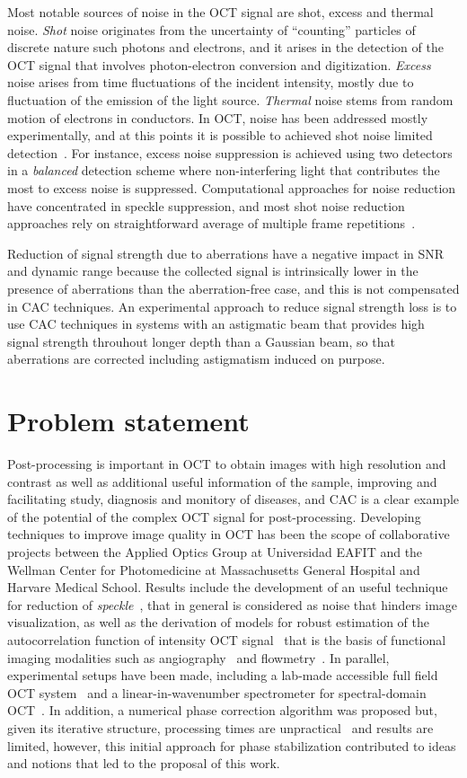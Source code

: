 Most notable sources of noise in the OCT signal are shot, excess and thermal noise.  \textit{Shot} noise originates from the uncertainty of ``counting'' particles of discrete nature such photons and electrons, and it arises in the detection of the OCT signal that involves photon-electron conversion and digitization. \textit{Excess} noise arises from time fluctuations of the incident intensity, mostly due to fluctuation of the emission of the light source. \textit{Thermal} noise stems from random motion of electrons in conductors. In OCT, noise has been addressed mostly experimentally, and at this points it is possible to achieved shot noise limited detection~\cite{}. For instance, excess noise suppression is achieved using two detectors in a \textit{balanced} detection scheme where non-interfering light that contributes the most to excess noise is suppressed. Computational approaches for noise reduction have concentrated in speckle suppression, and most shot noise reduction approaches rely on straightforward average of multiple frame repetitions~\cite{}.

Reduction of signal strength due to aberrations have a negative impact in SNR and dynamic range because the collected signal is intrinsically lower in the presence of aberrations than the aberration-free case, and this is not compensated in CAC techniques. An experimental approach to reduce signal strength loss is to use CAC techniques in systems with an astigmatic beam that provides high signal strength throuhout longer depth than a Gaussian beam, so that aberrations are corrected including astigmatism induced on purpose.


\section{Problem statement}

Post-processing is important in OCT to obtain images with high resolution and contrast as well as additional useful information of the sample, improving and facilitating study, diagnosis and monitory of diseases, and CAC is a clear example of the potential of the complex OCT signal for post-processing. Developing techniques to improve image quality in OCT has been the scope of collaborative projects between the Applied Optics Group at Universidad EAFIT and the Wellman Center for Photomedicine at Massachusetts General Hospital and Harvare Medical School. Results include the development of an useful technique for reduction of \textit{speckle}~\cite{}, that in general is considered as noise that hinders image visualization, as well as the derivation of models for robust estimation of the autocorrelation function of intensity OCT signal~\cite{} that is the basis of functional imaging modalities such as angiography~\cite{} and flowmetry~\cite{}. In parallel, experimental setups have been made, including a lab-made accessible full field OCT system~\cite{} and a linear-in-wavenumber spectrometer for spectral-domain OCT~\cite{}. In addition, a numerical phase correction algorithm was proposed but, given its iterative structure, processing times are unpractical~\cite{} and results are limited, however, this initial approach for phase stabilization contributed to ideas and notions that led to the proposal of this work. 

